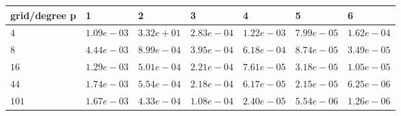 \begin{tabular}{lllllll}
\hline
 grid/degree p   & 1          & 2          & 3          & 4          & 5          & 6          \\
\hline
 $4$             & $1.09e-03$ & $3.32e+01$ & $2.83e-04$ & $1.22e-03$ & $7.99e-05$ & $1.62e-04$ \\
 $8$             & $4.44e-03$ & $8.99e-04$ & $3.95e-04$ & $6.18e-04$ & $8.74e-05$ & $3.49e-05$ \\
 $16$            & $1.29e-03$ & $5.01e-04$ & $2.21e-04$ & $7.61e-05$ & $3.18e-05$ & $1.05e-05$ \\
 $44$            & $1.74e-03$ & $5.54e-04$ & $2.18e-04$ & $6.17e-05$ & $2.15e-05$ & $6.25e-06$ \\
 $101$           & $1.67e-03$ & $4.33e-04$ & $1.08e-04$ & $2.40e-05$ & $5.54e-06$ & $1.26e-06$ \\
\hline
\end{tabular}